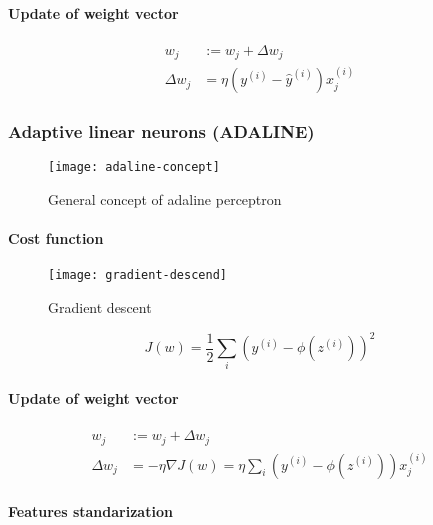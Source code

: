 \documentclass{article}
\begin{document}
			\paragraph{Update of weight vector}

			\begin{align}
					w_j &:= w_j + \Delta w_j \\
					\Delta w_j &= \eta(y^{(i)} - \hat{y}^{(i)}) x^{(i)}_j
			\end{align}

			\subsubsection{Adaptive linear neurons (ADALINE)}

			\begin{figure}
				\centering
				\texttt{[image: adaline-concept]}
				\caption{General concept of adaline perceptron}
				\label{fig:adaline-concept}
			\end{figure}

			\paragraph{Cost function}

			\begin{figure}
				\centering
				\texttt{[image: gradient-descend]}
				\caption{Gradient descent}
				\label{fig:gradient-descend}
			\end{figure}

			\begin{equation}
				J(w) = \frac{1}{2} \sum_i (y^{(i)}-\phi(z^{(i)}))^2
			\end{equation}

			\paragraph{Update of weight vector}

			\begin{align}
					w_j &:= w_j + \Delta w_j \\
					\Delta w_j &= -\eta\nabla J(w) = \eta\sum_i (y^{(i)} -\phi(z^{(i)}))x^{(i)}_j
			\end{align}

			\paragraph{Features standarization}
\end{document}

